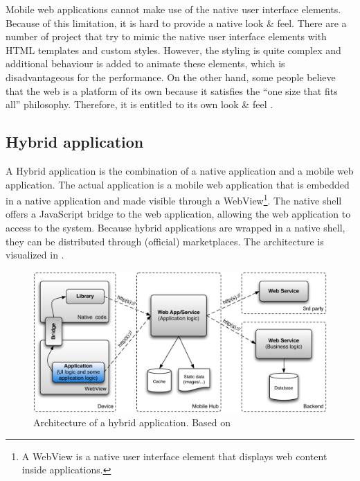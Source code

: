 Mobile web applications cannot make use of the native user interface elements. Because of this limitation, it is hard to provide a native look \& feel. There are a number of project that try to mimic the native user interface elements with HTML templates and custom styles. However, the styling is quite complex and additional behaviour is added to animate these elements, which is disadvantageous for the performance. On the other hand, some people believe that the web is a platform of its own because it satisfies the ``one size that fits all'' philosophy. Therefore, it is entitled to its own look \& feel \cite{Mahemoff:2011}.


\subsection{Hybrid application}

A Hybrid application is the combination of a native application and a mobile web application. The actual application is a mobile web application that is embedded in a native application and made visible through a WebView\footnote{A WebView is a native user interface element that displays web content inside applications.}. The native shell offers a JavaScript bridge to the web application, allowing the web application to access to the system. Because hybrid applications are wrapped in a native shell, they can be distributed through (official) marketplaces. The architecture is visualized in .

\begin{figure}[h]
    \begin{center}
        \includegraphics[width=\textwidth]{../resources/figs/hybrid.pdf}
        \caption{Architecture of a hybrid application. Based on \cite{Friese}}
        \label{fig:hybrid}
    \end{center}
\end{figure}

